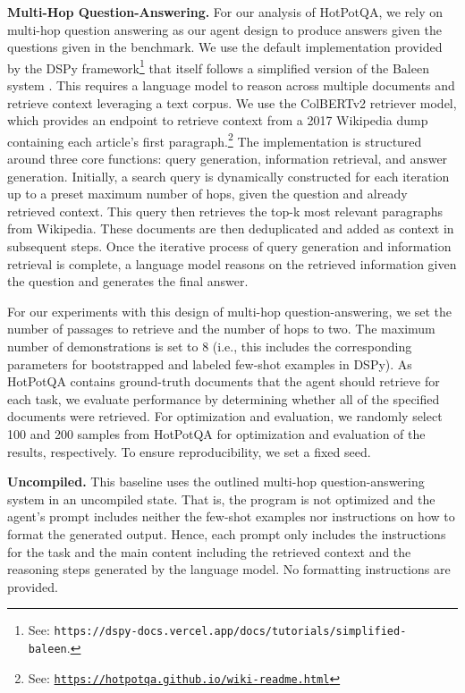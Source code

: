 \documentclass{article}
\begin{document}
\textbf{Multi-Hop Question-Answering.} For our analysis of HotPotQA, we rely on multi-hop question answering as our agent design to produce answers given the questions given in the benchmark. We use the default implementation provided by the DSPy framework\footnote{See: \texttt{{https://dspy-docs.vercel.app/docs/tutorials/simplified-baleen}}.} that itself follows a simplified version of the Baleen system \citep{khattab_baleen_2021}. This requires a language model to reason across multiple documents and retrieve context leveraging a text corpus. We use the ColBERTv2 retriever model, which provides an endpoint to retrieve context from a 2017 Wikipedia dump containing each article's first paragraph.\footnote{See: \texttt{\url{https://hotpotqa.github.io/wiki-readme.html}}} The implementation is structured around three core functions: query generation, information retrieval, and answer generation. Initially, a search query is dynamically constructed for each iteration up to a preset maximum number of hops, given the question and already retrieved context. This query then retrieves the top-k most relevant paragraphs from Wikipedia. These documents are then deduplicated and added as context in subsequent steps. Once the iterative process of query generation and information retrieval is complete, a language model reasons on the retrieved information given the question and generates the final answer. 

For our experiments with this design of multi-hop question-answering, we set the number of passages to retrieve and the number of hops to two. The maximum number of demonstrations is set to 8 (i.e., this includes the corresponding parameters for bootstrapped and labeled few-shot examples in DSPy). As HotPotQA contains ground-truth documents that the agent should retrieve for each task, we evaluate performance by determining whether all of the specified documents were retrieved. For optimization and evaluation, we randomly select 100 and 200 samples from HotPotQA for optimization and evaluation of the results, respectively. To ensure reproducibility, we set a fixed seed.

\textbf{Uncompiled.} This baseline uses the outlined multi-hop question-answering system in an uncompiled state. That is, the program is not optimized and the agent's prompt includes neither the few-shot examples nor instructions on how to format the generated output. Hence, each prompt only includes the instructions for the task and the main content including the retrieved context and the reasoning steps generated by the language model. No formatting instructions are provided.
\end{document}
